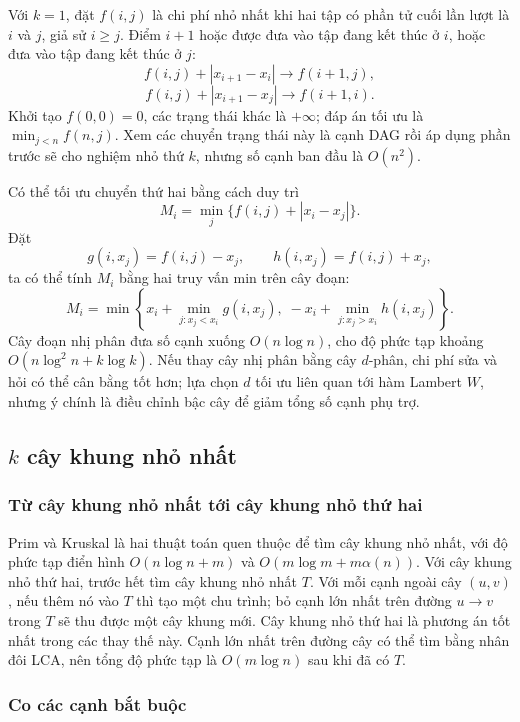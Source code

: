 \documentclass[11pt]{article}
\begin{document}
Với \(k=1\), đặt \(f(i,j)\) là chi phí nhỏ nhất khi hai tập có phần tử cuối lần
lượt là \(i\) và \(j\), giả sử \(i\ge j\). Điểm \(i+1\) hoặc được đưa vào tập
đang kết thúc ở \(i\), hoặc đưa vào tập đang kết thúc ở \(j\):
\[
  f(i,j)+|x_{i+1}-x_i|\to f(i+1,j),
\]
\[
  f(i,j)+|x_{i+1}-x_j|\to f(i+1,i).
\]
Khởi tạo \(f(0,0)=0\), các trạng thái khác là \(+\infty\); đáp án tối ưu là
\(\min_{j<n}f(n,j)\). Xem các chuyển trạng thái này là cạnh DAG rồi áp dụng
phần trước sẽ cho nghiệm nhỏ thứ \(k\), nhưng số cạnh ban đầu là \(O(n^2)\).

Có thể tối ưu chuyển thứ hai bằng cách duy trì
\[
  M_i=\min_j\{f(i,j)+|x_i-x_j|\}.
\]
Đặt
\[
  g(i,x_j)=f(i,j)-x_j,\qquad h(i,x_j)=f(i,j)+x_j,
\]
ta có thể tính \(M_i\) bằng hai truy vấn min trên cây đoạn:
\[
  M_i=\min\left\{x_i+\min_{j:x_j<x_i}g(i,x_j),\;
                 -x_i+\min_{j:x_j>x_i}h(i,x_j)\right\}.
\]
Cây đoạn nhị phân đưa số cạnh xuống \(O(n\log n)\), cho độ phức tạp khoảng
\(O(n\log^2 n+k\log k)\). Nếu thay cây nhị phân bằng cây \(d\)-phân, chi phí sửa
và hỏi có thể cân bằng tốt hơn; lựa chọn \(d\) tối ưu liên quan tới hàm Lambert
\(W\), nhưng ý chính là điều chỉnh bậc cây để giảm tổng số cạnh phụ trợ.

\subsection{\texorpdfstring{\(k\)}{k} cây khung nhỏ nhất}

\subsubsection{Từ cây khung nhỏ nhất tới cây khung nhỏ thứ hai}

Prim và Kruskal là hai thuật toán quen thuộc để tìm cây khung nhỏ nhất, với độ
phức tạp điển hình \(O(n\log n+m)\) và \(O(m\log m+m\alpha(n))\). Với cây khung
nhỏ thứ hai, trước hết tìm cây khung nhỏ nhất \(T\). Với mỗi cạnh ngoài cây
\((u,v)\), nếu thêm nó vào \(T\) thì tạo một chu trình; bỏ cạnh lớn nhất trên
đường \(u\to v\) trong \(T\) sẽ thu được một cây khung mới. Cây khung nhỏ
thứ hai là phương án tốt nhất trong các thay thế này. Cạnh lớn nhất trên đường
cây có thể tìm bằng nhân đôi LCA, nên tổng độ phức tạp là \(O(m\log n)\) sau
khi đã có \(T\).

\subsubsection{Co các cạnh bắt buộc}
\end{document}
